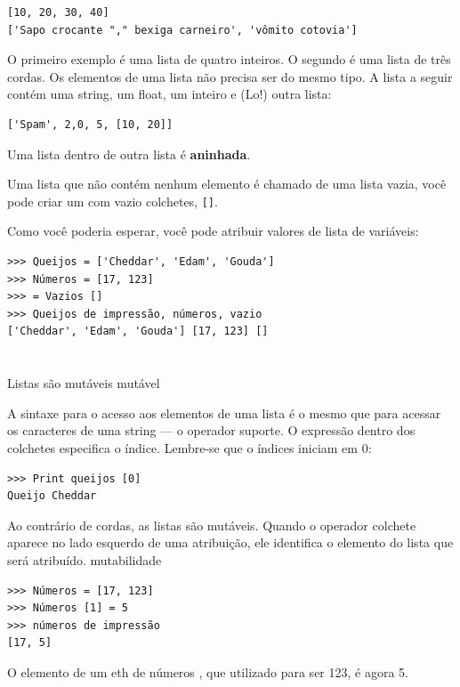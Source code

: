 \documentclass[10pt]{book}
\begin{document}
\begin{verbatim}
[10, 20, 30, 40]
['Sapo crocante "," bexiga carneiro', 'vômito cotovia']
\end{verbatim}
%
O primeiro exemplo é uma lista de quatro inteiros. O segundo é uma lista de
três cordas. Os elementos de uma lista não precisa ser do mesmo tipo.
A lista a seguir contém uma string, um float, um inteiro e
(Lo!) outra lista:

\begin{verbatim}
['Spam', 2,0, 5, [10, 20]]
\end{verbatim}
%
Uma lista dentro de outra lista é {\bf aninhada}.

Uma lista que não contém nenhum elemento é
chamado de uma lista vazia, você pode criar um com vazio
colchetes, \verb "[]".

Como você poderia esperar, você pode atribuir valores de lista de variáveis:

\begin{verbatim}
>>> Queijos = ['Cheddar', 'Edam', 'Gouda']
>>> Números = [17, 123]
>>> = Vazios []
>>> Queijos de impressão, números, vazio
['Cheddar', 'Edam', 'Gouda'] [17, 123] []
\end{verbatim}
%


\section {} Listas são mutáveis
\label{} mutável

A sintaxe para o acesso aos elementos de uma lista é o mesmo que para
acessar os caracteres de uma string --- o operador suporte. O
expressão dentro dos colchetes especifica o índice. Lembre-se que o
índices iniciam em 0:

\begin{verbatim}
>>> Print queijos [0]
Queijo Cheddar
\end{verbatim}
%
Ao contrário de cordas, as listas são mutáveis. Quando o operador colchete aparece
no lado esquerdo de uma atribuição, ele identifica o elemento do
lista que será atribuído.
\index{} mutabilidade

\begin{verbatim}
>>> Números = [17, 123]
>>> Números [1] = 5
>>> números de impressão
[17, 5]
\end{verbatim}
%
O elemento de um eth de números {\tt}, que
utilizado para ser 123, é agora 5.
\end{document}
